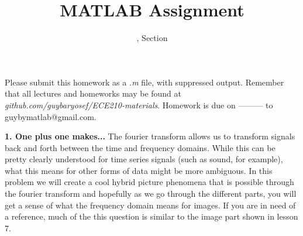 \documentclass[11pt]{article}
\title{MATLAB Assignment \Homework}
\author{\Session, Section \Section}
\date{}
\makeatletter
\def\MyEmail{guybymatlab@gmail.com}
\def\DateOfSubmission{ --------- }
\makeatother
\begin{document}
\maketitle
Please submit this homework as a \textit{.m} file, 
with suppressed output.
Remember that all lectures and homeworks may be found at 
\textit{github.com/guybaryosef/ECE210-materials}.
Homework is due on \DateOfSubmission to \MyEmail.


\noindent
\newline
\textbf{1. One plus one makes...}
The fourier transform allows us to transform signals back and 
forth between the time and frequency domains.
While this can be pretty clearly understood for time series signals
(such as sound, for example), what this means for other forms
of data might be more ambiguous.
In this problem we will create a cool hybrid picture phenomena that
is possible through the fourier transform and hopefully as we go 
through the different parts, you will get a sense of what the frequency
domain means for images.
If you are in need of a reference,
much of the this question is similar to the image part shown in lesson 7.
\end{document}
